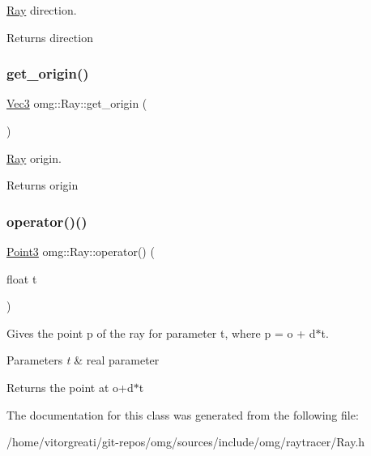 \mbox{\hyperlink{classomg_1_1_ray}{Ray}} direction. 

\begin{DoxyReturn}{Returns}
direction 
\end{DoxyReturn}
\mbox{\label{classomg_1_1_ray_a7f7c541289c92949e737522248be9b98}} 
\subsubsection{\texorpdfstring{get\_origin()}{get\_origin()}}
{\footnotesize\ttfamily \mbox{\hyperlink{namespaceomg_acf927839a305877d454c507f0b96730b}{Vec3}} omg\+::\+Ray\+::get\+\_\+origin (\begin{DoxyParamCaption}{ }\end{DoxyParamCaption})\hspace{0.3cm}{\ttfamily [inline]}}



\mbox{\hyperlink{classomg_1_1_ray}{Ray}} origin. 

\begin{DoxyReturn}{Returns}
origin 
\end{DoxyReturn}
\mbox{\label{classomg_1_1_ray_aa330c945bb3265ff966071591173ec13}} 
\subsubsection{\texorpdfstring{operator()()}{operator()()}}
{\footnotesize\ttfamily \mbox{\hyperlink{namespaceomg_af3df7d66f0c70fe64649fcbe00edba5e}{Point3}} omg\+::\+Ray\+::operator() (\begin{DoxyParamCaption}\item[{float}]{t }\end{DoxyParamCaption})\hspace{0.3cm}{\ttfamily [inline]}}



Gives the point p of the ray for parameter t, where p = o + d$\ast$t. 


\begin{DoxyParams}{Parameters}
{\em t} & real parameter \\
\hline
\end{DoxyParams}
\begin{DoxyReturn}{Returns}
the point at o+d$\ast$t 
\end{DoxyReturn}


The documentation for this class was generated from the following file\+:\begin{DoxyCompactItemize}
\item 
/home/vitorgreati/git-\/repos/omg/sources/include/omg/raytracer/Ray.\+h\end{DoxyCompactItemize}

